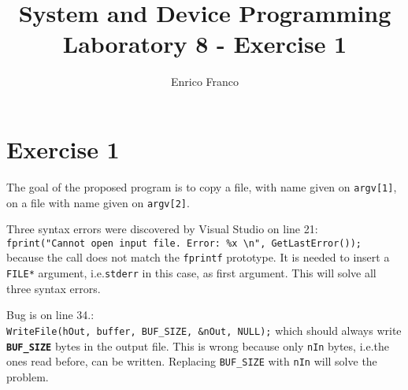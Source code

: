 \documentclass{report}
\author{Enrico Franco}
\title{System and Device Programming \\
	Laboratory 8 - Exercise 1}
\begin{document}
\section*{Exercise 1}

The goal of the proposed program is to copy a file, with name given on \texttt{argv[1]}, on a file with name given on \texttt{argv[2]}.

Three syntax errors were discovered by Visual Studio on line 21: \\
\texttt{fprint("Cannot open input file. Error: \%x \textbackslash n", GetLastError());} \\
because the call does not match the \texttt{fprintf} prototype. It is needed to insert a \texttt{FILE*} argument, i.e.\@ \texttt{stderr} in this case, as first argument. This will solve all three syntax errors.

Bug is on line 34.: \\
\texttt{WriteFile(hOut, buffer, BUF\_SIZE, \&nOut, NULL);} which should always write \texttt{\textbf{BUF\_SIZE}} bytes in the output file. This is wrong because only \texttt{nIn} bytes, i.e.\@ the ones read before, can be written. Replacing \texttt{BUF\_SIZE} with \texttt{nIn} will solve the problem.
\end{document}
